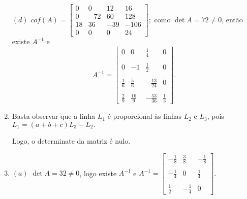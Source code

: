 \documentclass{report}
\begin{document}
\begin{enumerate}
$(d)$ $cof(A)=\left[
\begin{array}{rrrr}
0 & 0 & 12 & 16 \\
0 & -72 & 60 & 128 \\
18 & 36 & -39 & -106 \\
0 & 0 & 0 & 24
\end{array}
\right];$ como $\det A = 72 \ne 0$, então existe $A^{-1}$ e
$$A^{-1}=\left[
\begin{array}{rrrr}
0 &  0& \frac{1}{4} & 0 \\
& & & \\
0 & -1 & \frac{1}{2} &  0 \\
& & & \\
\frac{1}{6} & \frac{5}{6} & -\frac{13}{24} & 0 \\
& & & \\
\frac{2}{9} & \frac{16}{9} & -\frac{53}{36} & \frac{1}{3}
\end{array}
\right].$$








\item Basta observar que a linha $L_1$ é proporcional às linhas
$L_2$ e $L_3$, pois $L_1 = (a+b+c)L_3 -L_2.$

Logo, o determinate da matriz é nulo.




\item $(a)$ $\det A=32 \ne 0$, logo existe $A^{-1}$ e
$A^{-1}=\left[
\begin{array}{rrr}
-\frac{1}{8} & \frac{3}{8} & -\frac{1}{8} \\
& & \\
-\frac{1}{4} & 0 & \frac{1}{4} \\
& & \\
\frac{1}{2} & -\frac{1}{4} & 0
\end{array}
\right].$


\end{enumerate}
\end{document}
